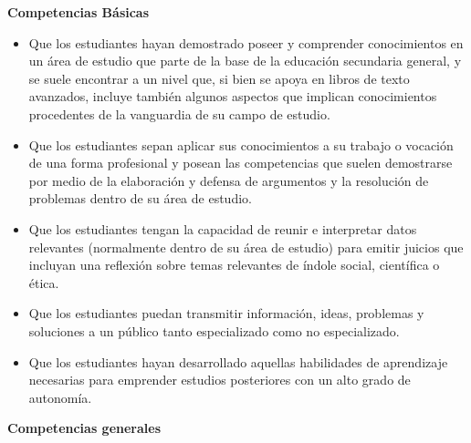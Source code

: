 \textbf{Competencias Básicas}

\begin{itemize}
\item Que los estudiantes hayan demostrado poseer y comprender conocimientos en un área de estudio que parte de la base de la educación secundaria general, y se suele encontrar a un nivel que, si bien se apoya en libros de texto avanzados, incluye también algunos aspectos que implican conocimientos procedentes de la vanguardia de su campo de estudio.

\item Que los estudiantes sepan aplicar sus conocimientos a su trabajo o vocación de una forma profesional y posean las competencias que suelen demostrarse por medio de la elaboración y defensa de argumentos y la resolución de problemas dentro de su área de estudio.

\item Que los estudiantes tengan la capacidad de reunir e interpretar datos relevantes (normalmente dentro de su área de estudio) para emitir juicios que incluyan una reflexión sobre temas relevantes de índole social, científica o ética.

\item Que los estudiantes puedan transmitir información, ideas, problemas y soluciones a un público tanto especializado como no especializado.

\item Que los estudiantes hayan desarrollado aquellas habilidades de aprendizaje necesarias para emprender estudios posteriores con un alto grado de autonomía.
\end{itemize}

\textbf{Competencias generales}

